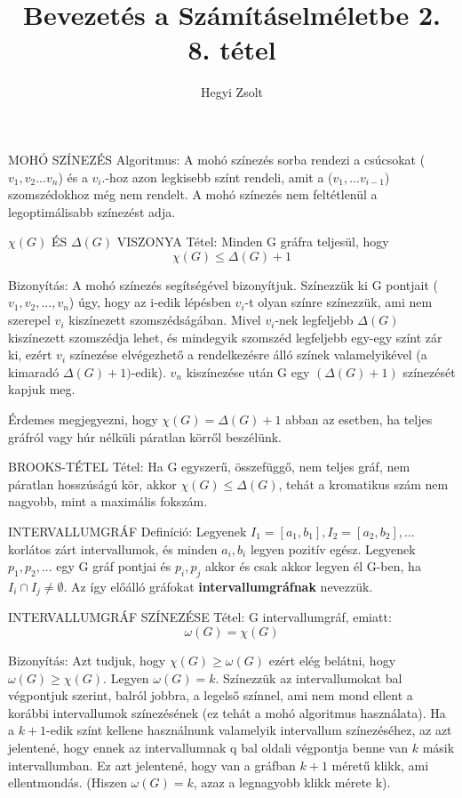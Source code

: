 \documentclass[]{article}
\title{Bevezetés a Számításelméletbe 2.\\{\large 8. tétel}}
\author{Hegyi Zsolt}
\begin{document}
\maketitle
\begin{framed}
MOHÓ SZÍNEZÉS Algoritmus: A mohó színezés sorba rendezi a csúcsokat ($v_1, v_2...v_n$) és a $v_i.$-hoz azon legkisebb színt rendeli, amit a ($v_1,...v_{i-1}$) szomszédokhoz még nem rendelt. A mohó színezés nem feltétlenül a legoptimálisabb színezést adja.
\end{framed}
\begin{framed}
$\chi(G)$ ÉS $\Delta(G)$ VISZONYA Tétel: Minden	G gráfra teljesül, hogy
$$\chi(G) \leq \Delta(G)+1$$
\end{framed}
\begin{leftbar}
Bizonyítás: A mohó színezés segítségével bizonyítjuk. Színezzük ki G pontjait ($v_1, v_2,..., v_n$) úgy, hogy az i-edik lépésben $v_i$-t olyan színre színezzük, ami nem szerepel $v_i$ kiszínezett szomszédságában. Mivel $v_i$-nek legfeljebb $\Delta(G)$ kiszínezett szomszédja lehet, és mindegyik szomszéd legfeljebb egy-egy színt zár ki, ezért $v_i$ színezése elvégezhető a rendelkezésre álló színek valamelyikével (a kimaradó $\Delta(G)+1)$-edik). $v_n$ kiszínezése után G egy $(\Delta(G)+1)$ színezését kapjuk meg.
\end{leftbar}
Érdemes megjegyezni, hogy $\chi(G) = \Delta(G)+1$ abban az esetben, ha teljes gráfról vagy húr nélküli páratlan körről beszélünk.
\begin{framed}
BROOKS-TÉTEL Tétel: Ha G egyszerű, összefüggő, nem teljes gráf, nem páratlan hosszúságú kör, akkor $\chi(G) \leq \Delta(G)$, tehát a kromatikus szám nem nagyobb, mint a maximális fokszám.
\end{framed}
\begin{shaded}
INTERVALLUMGRÁF Definíció: Legyenek $I_1 = [a_1, b_1], I_2 = [a_2, b_2],...$ korlátos zárt intervallumok, és minden $a_i, b_i$ legyen pozitív egész. Legyenek $p_1, p_2,...$ egy G gráf pontjai és ${p_i, p_j}$ akkor és csak akkor legyen él G-ben, ha $I_i\cap I_j \not= \emptyset$. Az így előálló gráfokat \textbf{intervallumgráfnak} nevezzük.
\end{shaded}
\begin{framed}
INTERVALLUMGRÁF SZÍNEZÉSE Tétel: G intervallumgráf, emiatt:
$$\omega(G) = \chi(G)$$
\end{framed}
\begin{leftbar}
Bizonyítás: Azt tudjuk, hogy $\chi (G)\geq \omega (G)$  ezért elég belátni, hogy $ \omega (G)\geq \chi (G)$. Legyen $ \omega (G)=k$. Színezzük az intervallumokat bal végpontjuk szerint, balról jobbra, a legelső színnel, ami nem mond ellent a korábbi intervallumok színezésének (ez tehát a mohó algoritmus használata). Ha a $k+1$-edik színt kellene használnunk valamelyik intervallum színezéséhez, az azt jelentené, hogy ennek az intervallumnak q bal oldali végpontja benne van $k$  másik intervallumban. Ez azt jelentené, hogy van a gráfban $k+1$  méretű klikk, ami ellentmondás. (Hiszen $ \omega (G)=k$, azaz a legnagyobb klikk mérete k).
\end{leftbar}
\end{document}
